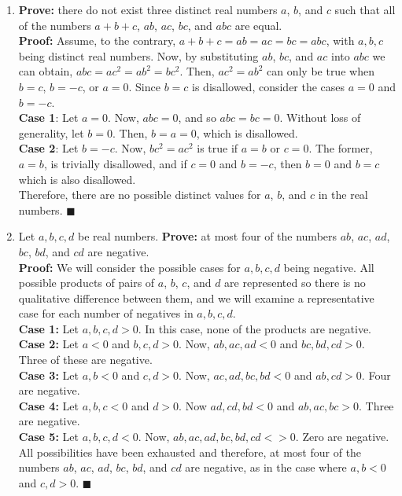 \documentclass[12pt]{article}
\newcommand{\qed}{\(\blacksquare\)}
\begin{document}
\begin{enumerate}
        \item \textbf{Prove:} there do not exist three distinct real numbers \(a\), \(b\), and \(c\) such that all of the numbers \(a+b+c\), \(ab\), \(ac\), \(bc\), and \(abc\) are equal.\\ \textbf{Proof:} Assume, to the contrary, \(a+b+c=ab=ac=bc=abc\), with \(a,b,c\) being distinct real numbers. Now, by substituting \(ab\), \(bc\), and \(ac\) into \(abc\) we can obtain, \(abc=ac^2=ab^2=bc^2\). Then, \(ac^2=ab^2\) can only be true when \(b=c\), \(b=-c\), or \(a=0\). Since \(b=c\) is disallowed, consider the cases \(a=0\) and \(b=-c\). \\ \textbf{Case 1}: Let \(a=0\). Now, \(abc=0\), and so \(abc=bc=0\). Without loss of generality, let \(b=0\). Then, \(b=a=0\), which is disallowed.\\ \textbf{Case 2}: Let \(b=-c\). Now, \(bc^2=ac^2\) is true if \(a=b\) or \(c=0\). The former, \(a=b\), is trivially disallowed, and if \(c=0\) and \(b=-c\), then \(b=0\) and \(b=c\) which is also disallowed. \\Therefore, there are no possible distinct values for \(a\), \(b\), and \(c\) in the real numbers. \qed
        \item Let \(a,b,c,d\) be real numbers. \textbf{Prove:} at most four of the numbers \(ab\), \(ac\), \(ad\), \(bc\), \(bd\), and \(cd\) are negative. \\ \textbf{Proof:} We will consider the possible cases for \(a,b,c,d\) being negative. All possible products of pairs of \(a\), \(b\), \(c\), and \(d\) are represented so there is no qualitative difference between them, and we will examine a representative case for each number of negatives in \(a,b,c,d\). \\
        \textbf{Case 1:} Let \(a,b,c,d>0\). In this case, none of the products are negative.\\ 
        \textbf{Case 2:} Let \(a<0\) and \(b,c,d>0\). Now, \(ab,ac,ad<0\) and \(bc,bd,cd>0\). Three of these are negative.\\ 
        \textbf{Case 3:} Let \(a,b<0\) and \(c,d>0\). Now, \(ac,ad, bc, bd<0\) and \(ab, cd>0\). Four are negative.\\
        \textbf{Case 4:} Let \(a,b,c<0\) and \(d>0\). Now \(ad, cd, bd<0\) and \(ab, ac, bc>0\). Three are negative.\\
        \textbf{Case 5:} Let \(a,b,c,d<0\). Now, \(ab,ac,ad,bc,bd,cd<>0\). Zero are negative.\\
        All possibilities have been exhausted and therefore, at most four of the numbers \(ab\), \(ac\), \(ad\), \(bc\), \(bd\), and \(cd\) are negative, as in the case where \(a,b<0\) and \(c,d>0\). \qed
    \end{enumerate}
\end{document}
